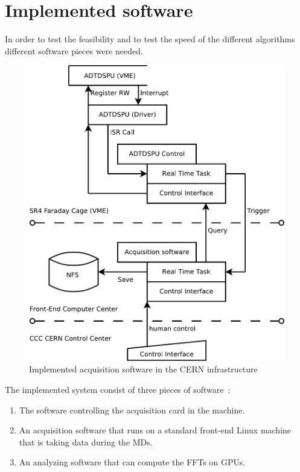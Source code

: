 \chapter{Implemented software}

In order to test the feasibility and to test the speed of the different algorithms different software pieces were needed.

\begin{figure}[H]
\caption{Implemented acquisition software in the CERN infrastructure}
\centering
\includegraphics[scale=0.4]{ImplementedSoftFesa.pdf}
\end{figure}

The implemented system consist of three pieces of software~:
\begin{enumerate}
\item The software controlling the acquisition card in the machine.
\item An acquisition software that runs on a standard front-end Linux machine that is taking data during the \glspl{MD}.
\item An analyzing software that can compute the \glspl{FFT} on \glspl{GPU}.
\end{enumerate}

